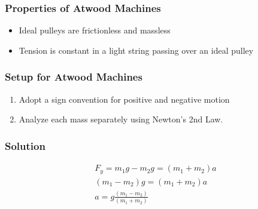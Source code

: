\documentclass[../Notes.tex]{subfiles}
\begin{document}
	\subsubsection{Properties of Atwood Machines}
	\begin{itemize}
		\item Ideal pulleys are frictionless and massless
		\item Tension is constant in a light string passing over an ideal pulley
	\end{itemize}

	\subsubsection{Setup for Atwood Machines}
	\begin{enumerate}
		\item Adopt a sign convention for positive and negative motion
		\item Analyze each mass separately using Newton's 2nd Law.
	\end{enumerate}

	\subsubsection{Solution}
	\begin{align*}
	F_{y} = m_1 g - m_2 g = (m_1 + m_2)a \\
	(m_1 - m_2)g = (m_1 + m_2)a \\
	a = g \frac{(m_1 - m_2)}{(m_1 + m_2)}
	\end{align*}
\end{document}
